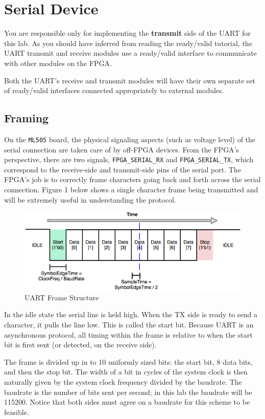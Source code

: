 \documentclass[11pt]{article}
\begin{document}
\section{Serial Device}
You are responsible only for implementing the \textbf{transmit} side of the UART for this lab. As you should have inferred from reading the ready/valid tutorial, the UART transmit and receive modules use a ready/valid interface to communicate with other modules on the FPGA.

Both the UART’s receive and transmit modules will have their own separate set of ready/valid interfaces connected appropriately to external modules.

\subsection{Framing}
On the \verb|ML505| board, the physical signaling aspects (such as voltage level) of the serial connection are taken care of by off-FPGA devices. From the FPGA's perspective, there are two signals, \verb|FPGA_SERIAL_RX| and \verb|FPGA_SERIAL_TX|, which correspond to the receive-side and transmit-side pins of the serial port. The FPGA's job is to correctly frame characters going back and forth across the serial connection. Figure 1 below shows a single character frame being transmitted and will be extremely useful in understanding the protocol.

\begin{figure}[H]
	\centerline{\includegraphics[width=6in]{images/uart_frame.png}}
	\caption{UART Frame Structure}
\end{figure}

In the idle state the serial line is held high. When the TX side is ready to send a character, it pulls the line low. This is called the start bit. Because UART is an asynchronous protocol, all timing within the frame is relative to when the start bit is first sent (or detected, on the receive side). 

The frame is divided up in to 10 uniformly sized bits: the start bit, 8 data bits, and then the stop bit. The width of a bit in cycles of the system clock is then naturally given by the system clock frequency divided by the baudrate. The baudrate is the number of bits sent per second; in this lab the baudrate will be 115200. Notice that both sides must agree on a baudrate for this scheme to be feasible.
\end{document}
